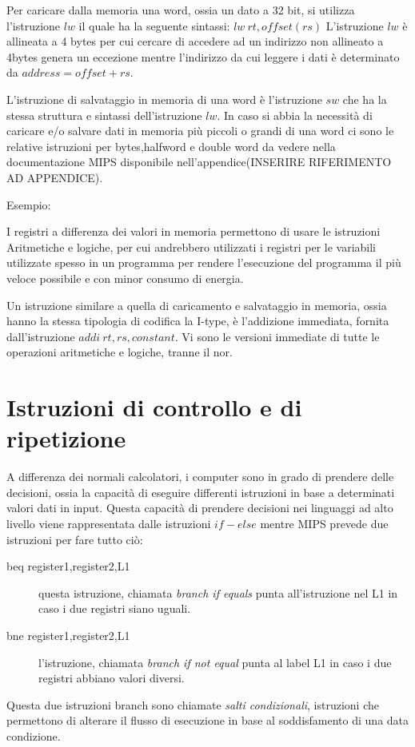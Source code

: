 
Per caricare dalla memoria una word, ossia un dato a 32 bit, si utilizza l'istruzione $lw$
il quale ha la seguente sintassi: $lw \ rt,offset(rs)$
L'istruzione $lw$ è allineata a 4 bytes per cui cercare di accedere ad un indirizzo
non allineato a 4bytes genera un eccezione mentre l'indirizzo da cui leggere i dati
è determinato da $address = offset + rs$.

L'istruzione di salvataggio in memoria di una word è l'istruzione $sw$ che ha la
stessa struttura e sintassi dell'istruzione $lw$.
In caso si abbia la necessità di caricare e/o salvare dati in memoria più piccoli
o grandi di una word ci sono le relative istruzioni per bytes,halfword e double word
da vedere nella documentazione MIPS disponibile nell'appendice(INSERIRE RIFERIMENTO AD APPENDICE).

Esempio:\newline

I registri a differenza dei valori in memoria permettono di usare le istruzioni Aritmetiche
e logiche, per cui andrebbero utilizzati i registri per le variabili utilizzate spesso
in un programma per rendere l'esecuzione del programma il più veloce possibile e
con minor consumo di energia.

Un istruzione similare a quella di caricamento e salvataggio in memoria, ossia hanno
la stessa tipologia di codifica la I-type, è l'addizione immediata, fornita dall'istruzione $addi \ rt,rs,constant$.\newline
Vi sono le versioni immediate di tutte le operazioni aritmetiche e logiche, tranne il nor.

\section{Istruzioni di controllo e di ripetizione}
A differenza dei normali calcolatori, i computer sono in grado di prendere delle decisioni,
ossia la capacità di eseguire differenti istruzioni in base a determinati valori dati in input.\newline
Questa capacità di prendere decisioni nei linguaggi ad alto livello viene rappresentata
dalle istruzioni $if-else$ mentre MIPS prevede due istruzioni per fare tutto ciò:
\begin{description}
  \item[beq register1,register2,L1] questa istruzione, chiamata \emph{branch if equals} punta all'istruzione nel L1
        in caso i due registri siano uguali.
  \item[bne register1,register2,L1] l'istruzione, chiamata \emph{branch if not equal} punta al label L1 in caso i due
        registri abbiano valori diversi.
\end{description}
Questa due istruzioni branch sono chiamate \emph{salti condizionali}, istruzioni
che permettono di alterare il flusso di esecuzione in base al soddisfamento di una data condizione.


